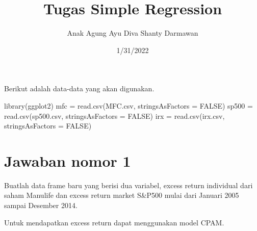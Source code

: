 \documentclass[
]{article}
\title{Tugas Simple Regression}
\author{Anak Agung Ayu Diva Shanty Darmawan}
\date{1/31/2022}
\newenvironment{Shaded}{\begin{snugshade}}{\end{snugshade}}
\newcommand{\AttributeTok}[1]{\textcolor[rgb]{0.77,0.63,0.00}{#1}}
\newcommand{\ConstantTok}[1]{\textcolor[rgb]{0.00,0.00,0.00}{#1}}
\newcommand{\FunctionTok}[1]{\textcolor[rgb]{0.00,0.00,0.00}{#1}}
\newcommand{\NormalTok}[1]{#1}
\newcommand{\OtherTok}[1]{\textcolor[rgb]{0.56,0.35,0.01}{#1}}
\newcommand{\StringTok}[1]{\textcolor[rgb]{0.31,0.60,0.02}{#1}}
\begin{document}
\maketitle

{
\setcounter{tocdepth}{2}
\tableofcontents
}
Berikut adalah data-data yang akan digunakan.

\begin{Shaded}
\begin{Highlighting}[]
\FunctionTok{library}\NormalTok{(ggplot2)}
\NormalTok{mfc }\OtherTok{=} \FunctionTok{read.csv}\NormalTok{(}\StringTok{\textquotesingle{}MFC.csv\textquotesingle{}}\NormalTok{, }\AttributeTok{stringsAsFactors =} \ConstantTok{FALSE}\NormalTok{)}
\NormalTok{sp500 }\OtherTok{=} \FunctionTok{read.csv}\NormalTok{(}\StringTok{\textquotesingle{}sp500.csv\textquotesingle{}}\NormalTok{, }\AttributeTok{stringsAsFactors =} \ConstantTok{FALSE}\NormalTok{)}
\NormalTok{irx }\OtherTok{=} \FunctionTok{read.csv}\NormalTok{(}\StringTok{\textquotesingle{}irx.csv\textquotesingle{}}\NormalTok{, }\AttributeTok{stringsAsFactors =} \ConstantTok{FALSE}\NormalTok{)}
\end{Highlighting}
\end{Shaded}

\hypertarget{jawaban-nomor-1}{%
\section{Jawaban nomor 1}\label{jawaban-nomor-1}}

Buatlah data frame baru yang berisi dua variabel, excess return
individual dari saham Manulife dan excess return market S\&P500 mulai
dari Januari 2005 sampai Desember 2014.

Untuk mendapatkan excess return dapat menggunakan model CPAM.
\end{document}
